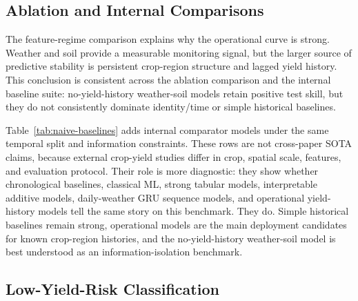 \documentclass[wcp]{jmlr}
\begin{document}
\begin{table}[t]
\centering
\caption{Validation-selected test performance by forecast window for the no-yield-history weather-soil model and the operational with yield history model.}
\label{tab:lead-time}

\end{table}
\FloatBarrier

\subsection{Ablation and Internal Comparisons}

The feature-regime comparison explains why the operational curve is strong. Weather and soil provide a measurable monitoring signal, but the larger source of predictive stability is persistent crop-region structure and lagged yield history. This conclusion is consistent across the ablation comparison and the internal baseline suite: no-yield-history weather-soil models retain positive test skill, but they do not consistently dominate identity/time or simple historical baselines.

Table~\ref{tab:naive-baselines} adds internal comparator models under the same temporal split and information constraints. These rows are not cross-paper SOTA claims, because external crop-yield studies differ in crop, spatial scale, features, and evaluation protocol. Their role is more diagnostic: they show whether chronological baselines, classical ML, strong tabular models, interpretable additive models, daily-weather GRU sequence models, and operational yield-history models tell the same story on this benchmark. They do. Simple historical baselines remain strong, operational models are the main deployment candidates for known crop-region histories, and the no-yield-history weather-soil model is best understood as an information-isolation benchmark.

\begin{table}[t]
\centering
\caption{Internal baseline-suite comparison under the same leakage-safe split. Each row reports the best validation-selected May-Oct model within the listed group and regime; the comparison is internal to this benchmark and is not a claim of outperforming external crop-yield systems.}
\label{tab:naive-baselines}
\resizebox{\textwidth}{!}{}
\end{table}
\FloatBarrier

\subsection{Low-Yield-Risk Classification}
\end{document}
